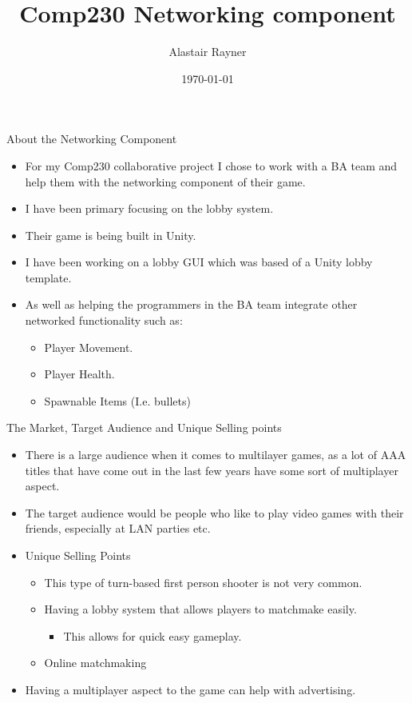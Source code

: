 \documentclass{beamer}
\title{Comp230 Networking component}
\author{Alastair Rayner}
\date{\today}
\begin{document}
\maketitle

\begin{frame}{About the Networking Component}
	\begin{itemize}
		\item For my Comp230 collaborative project I chose to work with a BA team and help them with the networking component of their game.\pause
		\item I have been primary focusing on the lobby system. \pause
		\item Their game is being built in Unity. \pause
		\item I have been working on a lobby GUI which was based of a Unity lobby template. \pause
		\item As well as helping the programmers in the BA team integrate other networked functionality such as: \pause
		\begin{itemize}
			\item Player Movement. \pause
			\item Player Health. \pause
			\item Spawnable Items (I.e. bullets)
		\end{itemize}
	\end{itemize}
\end{frame}

\begin{frame}{The Market, Target Audience and Unique Selling points}
	\begin{itemize}
		\item There is a large audience when it comes to multilayer games, as a lot of AAA titles that have come out in the last few years have some sort of multiplayer aspect. \pause
		\item The target audience would be people who like to play video games with their friends, especially at LAN parties etc. \pause
		\item Unique Selling Points \pause
			\begin{itemize}
				\item This type of turn-based first person shooter is not very common. \pause
				\item Having a lobby system that allows players to matchmake easily. \pause
				\begin{itemize}
					\item This allows for quick easy gameplay.  \pause
				\end{itemize}
				\item  Online matchmaking \pause
				
			\end{itemize}
		\item Having a multiplayer aspect to the game can help with advertising.
	\end{itemize}
\end{frame}
\end{document}
